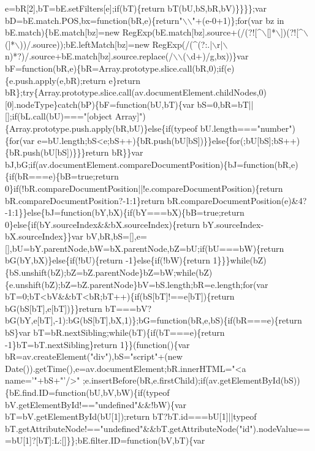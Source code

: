 \begin{DoxyCode}
{       e=bR[2],bT=bE.setFilters[e];if(bT)\{return bT(bU,bS,bR,bV)\}\}\}\};var bD=bE.match.POS,bx=function(bR,e)\{return"}\(\backslash\)\(\backslash\)\textcolor{stringliteral}{"+(e-0+1)\};for(var bz in
       bE.match)\{bE.match[bz]=new RegExp(bE.match[bz].source+(/(?![^\(\backslash\)[]*\(\backslash\)])(?![^\(\backslash\)(]*\(\backslash\)))/.source));bE.leftMatch[bz]=new
       RegExp(/(^(?:.|\(\backslash\)r|\(\backslash\)n)*?)/.source+bE.match[bz].source.replace(/\(\backslash\)\(\backslash\)(\(\backslash\)d+)/g,bx))\}var
       bF=function(bR,e)\{bR=Array.prototype.slice.call(bR,0);if(e)\{e.push.apply(e,bR);return e\}return
       bR\};try\{Array.prototype.slice.call(av.documentElement.childNodes,0)[0].nodeType\}catch(bP)\{bF=function(bU,bT)\{var bS=0,bR=bT||[];if(bL.call(bU)==="}[\textcolor{keywordtype}{object} 
      Array]\textcolor{stringliteral}{")\{Array.prototype.push.apply(bR,bU)\}else\{if(typeof bU.length==="}number\textcolor{stringliteral}{")\{for(var
       e=bU.length;bS<e;bS++)\{bR.push(bU[bS])\}\}else\{for(;bU[bS];bS++)\{bR.push(bU[bS])\}\}\}return bR\}\}var
       bJ,bG;if(av.documentElement.compareDocumentPosition)\{bJ=function(bR,e)\{if(bR===e)\{bB=true;return
       0\}if(!bR.compareDocumentPosition||!e.compareDocumentPosition)\{return bR.compareDocumentPosition?-1:1\}return
       bR.compareDocumentPosition(e)&4?-1:1\}\}else\{bJ=function(bY,bX)\{if(bY===bX)\{bB=true;return 0\}else\{if(bY.sourceIndex&&bX.sourceIndex)\{return
       bY.sourceIndex-bX.sourceIndex\}\}var bV,bR,bS=[],e=[],bU=bY.parentNode,bW=bX.parentNode,bZ=bU;if(bU===bW)\{return
       bG(bY,bX)\}else\{if(!bU)\{return -1\}else\{if(!bW)\{return
       1\}\}\}while(bZ)\{bS.unshift(bZ);bZ=bZ.parentNode\}bZ=bW;while(bZ)\{e.unshift(bZ);bZ=bZ.parentNode\}bV=bS.length;bR=e.length;for(var
       bT=0;bT<bV&&bT<bR;bT++)\{if(bS[bT]!==e[bT])\{return bG(bS[bT],e[bT])\}\}return bT===bV?bG(bY,e[bT],-1):bG(bS[bT],bX,1)\};bG=function(bR,e,bS)\{if(bR===e)\{return
       bS\}var bT=bR.nextSibling;while(bT)\{if(bT===e)\{return -1\}bT=bT.nextSibling\}return 1\}\}(function()\{var
       bR=av.createElement("}div\textcolor{stringliteral}{"),bS="}script\textcolor{stringliteral}{"+(new Date()).getTime(),e=av.documentElement;bR.innerHTML="}<a name=\textcolor{stringliteral}{'"+bS+"'}/>\textcolor{stringliteral}{"
      ;e.insertBefore(bR,e.firstChild);if(av.getElementById(bS))\{bE.find.ID=function(bU,bV,bW)\{if(typeof
       bV.getElementById!=="}undefined\textcolor{stringliteral}{"&&!bW)\{var bT=bV.getElementById(bU[1]);return bT?bT.id===bU[1]||typeof
       bT.getAttributeNode!=="}undefined\textcolor{stringliteral}{"&&bT.getAttributeNode("}\textcolor{keywordtype}{id}\textcolor{stringliteral}{").nodeValue===bU[1]?[bT]:L:[]\}\};bE.filter.ID=function(bV,bT)\{var
}
\end{DoxyCode}
